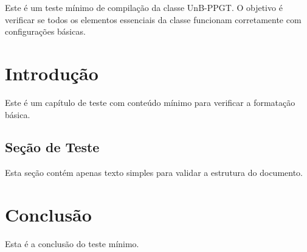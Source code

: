 \documentclass[mestrado,12pt]{UnB-PPGT}
\begin{document}
\pretextual

\capa
\folhaderosto
\folhadeaprovacao

\begin{resumo}
Este é um teste mínimo de compilação da classe UnB-PPGT. O objetivo é verificar se todos os elementos essenciais da classe funcionam corretamente com configurações básicas.
\end{resumo}

\begin{abstract}
This is a minimal compilation test for the UnB-PPGT class. The objective is to verify that all essential elements of the class work correctly with basic configurations.
\end{abstract}

\textual

\chapter{Introdução}
Este é um capítulo de teste com conteúdo mínimo para verificar a formatação básica.

\section{Seção de Teste}
Esta seção contém apenas texto simples para validar a estrutura do documento.

\chapter{Conclusão}
Esta é a conclusão do teste mínimo.

\postextual
\end{document}
